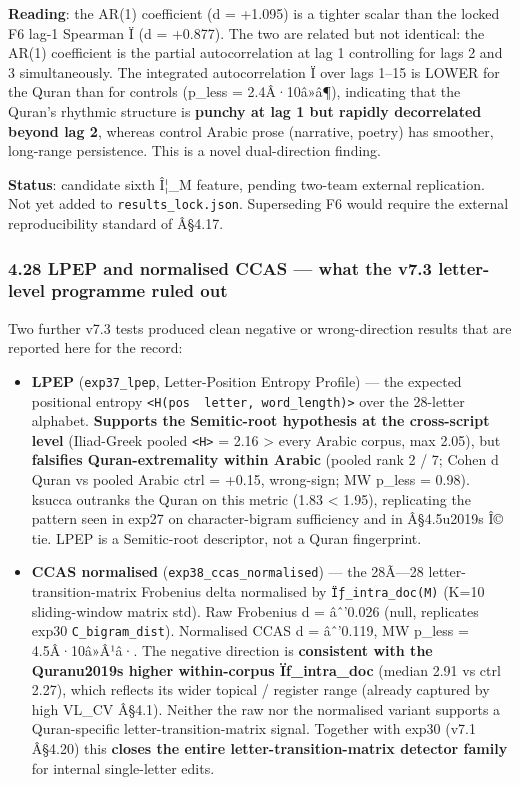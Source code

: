 \documentclass[
]{article}
\begin{document}
\textbf{Reading}: the AR(1) coefficient (d = +1.095) is a tighter scalar
than the locked F6 lag-1 Spearman Ï (d = +0.877). The two are related
but not identical: the AR(1) coefficient is the partial autocorrelation
at lag 1 controlling for lags 2 and 3 simultaneously. The integrated
autocorrelation \textbar Ï\textbar{} over lags 1--15 is LOWER for the
Quran than for controls (p\_less = 2.4Â·10â»â¶), indicating that the
Quran's rhythmic structure is \textbf{punchy at lag 1 but rapidly
decorrelated beyond lag 2}, whereas control Arabic prose (narrative,
poetry) has smoother, long-range persistence. This is a novel
dual-direction finding.

\textbf{Status}: candidate sixth Î¦\_M feature, pending two-team
external replication. Not yet added to \texttt{results\_lock.json}.
Superseding F6 would require the external reproducibility standard of
Â§4.17.

\subsubsection{4.28 LPEP and normalised CCAS --- what the v7.3
letter-level programme ruled
out}\label{lpep-and-normalised-ccas-what-the-v7.3-letter-level-programme-ruled-out}

Two further v7.3 tests produced clean negative or wrong-direction
results that are reported here for the record:

\begin{itemize}
\item
  \textbf{LPEP} (\texttt{exp37\_lpep}, Letter-Position Entropy Profile)
  --- the expected positional entropy
  \texttt{\textless{}H(pos\ \textbar{}\ letter,\ word\_length)\textgreater{}}
  over the 28-letter alphabet. \textbf{Supports the Semitic-root
  hypothesis at the cross-script level} (Iliad-Greek pooled
  \texttt{\textless{}H\textgreater{}} = 2.16 \textgreater{} every Arabic
  corpus, max 2.05), but \textbf{falsifies Quran-extremality within
  Arabic} (pooled rank 2 / 7; Cohen d Quran vs pooled Arabic ctrl =
  +0.15, wrong-sign; MW p\_less = 0.98). ksucca outranks the Quran on
  this metric (1.83 \textless{} 1.95), replicating the pattern seen in
  exp27 on character-bigram sufficiency and in Â§4.5u2019s Î© tie. LPEP
  is a Semitic-root descriptor, not a Quran fingerprint.
\item
  \textbf{CCAS normalised} (\texttt{exp38\_ccas\_normalised}) --- the
  28Ã---28 letter-transition-matrix Frobenius delta normalised by
  \texttt{Ïƒ\_intra\_doc(M)} (K=10 sliding-window matrix std). Raw
  Frobenius d = âˆ'0.026 (null, replicates exp30
  \texttt{C\_bigram\_dist}). Normalised CCAS d = âˆ'0.119, MW p\_less =
  4.5Â·10â»Â¹â·. The negative direction is \textbf{consistent with the
  Quranu2019s higher within-corpus Ïƒ\_intra\_doc} (median 2.91 vs ctrl
  2.27), which reflects its wider topical / register range (already
  captured by high VL\_CV Â§4.1). Neither the raw nor the normalised
  variant supports a Quran-specific letter-transition-matrix signal.
  Together with exp30 (v7.1 Â§4.20) this \textbf{closes the entire
  letter-transition-matrix detector family} for internal single-letter
  edits.
\end{itemize}
\end{document}
